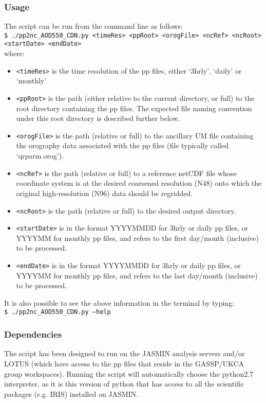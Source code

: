 \documentclass[10pt,a4paper]{article}
\newcommand\tab[1][0.5cm]{\hspace*{#1}}
\begin{document}
\subsubsection{Usage}
The script can be run from the command line as follows:\\
\tab \texttt{\$ ./pp2nc\_AOD550\_CDN.py <timeRes> <ppRoot> <orogFile> <ncRef> <ncRoot> <startDate> <endDate>}\\
where:
\begin{itemize}
\item \texttt{<timeRes>} is the time resolution of the pp files, either `3hrly', `daily' or `monthly'
\item \texttt{<ppRoot>} is the path (either relative to the current directory, or full) to the root directory containing the pp files. The expected file naming convention under this root directory is described further below.
\item \texttt{<orogFile>} is the path (relative or full) to the ancillary UM file containing the orography data associated with the pp files (file typically called `qrparm.orog').
\item \texttt{<ncRef>} is the path (relative or full) to a reference netCDF file whose coordinate system is at the desired coarsened resolution (N48) onto which the original high-resolution (N96) data should be regridded.
\item \texttt{<ncRoot>} is the path (relative or full) to the desired output directory.
\item \texttt{<startDate>} is in the format YYYYMMDD for 3hrly or daily pp files, or YYYYMM for monthly pp files, and refers to the first day/month (inclusive) to be processed.
\item \texttt{<endDate>} is in the format YYYYMMDD for 3hrly or daily pp files, or YYYYMM for monthly pp files, and refers to the last day/month (inclusive) to be processed.
\end{itemize}
It is also possible to see the above information in the terminal by typing:\\
\tab \texttt{\$ ./pp2nc\_AOD550\_CDN.py --help}

\subsubsection{Dependencies}
The script has been designed to run on the JASMIN analysis servers and/or LOTUS (which have access to the pp files that reside in the GASSP/UKCA group workspaces). Running the script will automatically choose the python2.7 interpreter, as it is this version of python that has access to all the scientific packages (e.g. IRIS) installed on JASMIN.\\
\end{document}

